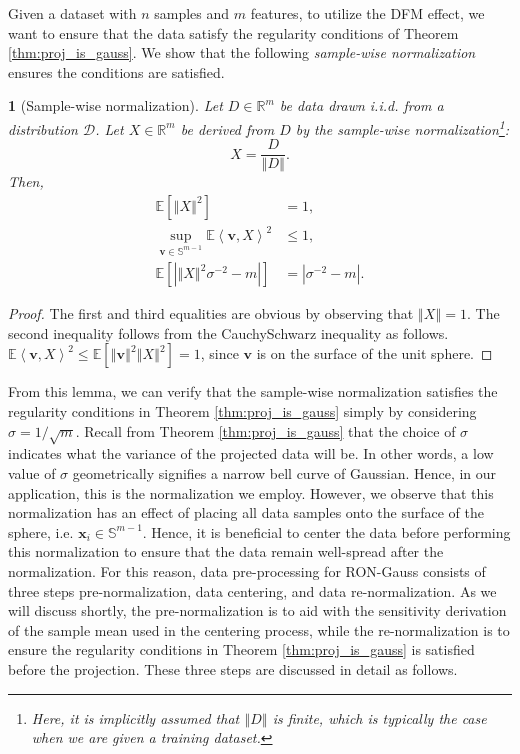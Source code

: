 \documentclass[USenglish,oneside,twocolumn]{article}
\theoremstyle{definition}
\theoremstyle{remark}
\theoremstyle{plain}
\theoremstyle{plain}
\newtheorem{lem}{\protect\lemmaname}
\providecommand{\lemmaname}{Lemma}
\begin{document}
Given a dataset with $n$ samples
and $m$ features, to utilize the DFM effect, we want to ensure that
the data satisfy the regularity conditions of Theorem \ref{thm:proj_is_gauss}.
We show that the following \emph{sample-wise normalization} ensures
the conditions are satisfied.
\begin{lem}[Sample-wise normalization]
\label{lem:normalization}Let $D\in\mathbb{R}^{m}$ be data drawn
i.i.d. from a distribution $\mathcal{D}$. Let $X\in\mathbb{R}^{m}$
be derived from $D$ by the sample-wise normalization\footnote{Here, it is implicitly assumed that $\left\Vert D\right\Vert$ is finite, which is typically the case when we are given a training dataset.}:
\[
X=\frac{D}{\left\Vert D\right\Vert }.
\]
Then, 
\begin{align*}
\mathbb{E}\left[\left\Vert X\right\Vert ^{2}\right] & =1,\\
\sup_{\mathbf{v}\in\mathbb{S}^{m-1}}\mathbb{E}\left\langle \mathbf{v},X\right\rangle ^{2} & \leq1,\\
\mathbb{E}\left[\left|\left\Vert X\right\Vert ^{2}\sigma^{-2}-m\right|\right] & =\left|\sigma^{-2}-m\right|.
\end{align*}
\end{lem}
\begin{proof}
The first and third equalities are obvious by observing that $\left\Vert X\right\Vert =1$.
The second inequality follows from the Cauchy\textendash Schwarz
inequality \cite{RefWorks:525,RefWorks:526} as follows. $\mathbb{E}\left\langle \mathbf{v},X\right\rangle ^{2}\leq\mathbb{E}\left[\left\Vert \mathbf{v}\right\Vert ^{2}\left\Vert X\right\Vert ^{2}\right]=1$,
since $\mathbf{v}$ is on the surface of the unit sphere. 
\end{proof}
%
From this lemma, we can verify that the sample-wise normalization
satisfies the regularity conditions in Theorem \ref{thm:proj_is_gauss}
simply by considering $\sigma=1/\sqrt{m}$. Recall from Theorem \ref{thm:proj_is_gauss} that the choice of $\sigma$ indicates what the variance of the projected data will be. In other words, a low value of $\sigma$ geometrically signifies a narrow bell curve of Gaussian. Hence, in our application,
this is the normalization we employ. However, we observe that this
normalization has an effect of placing all data samples onto the surface
of the sphere, i.e. $\mathbf{x}_{i}\in\mathbb{S}^{m-1}$. Hence, it
is beneficial to center the data before performing this normalization
to ensure that the data remain well-spread after the normalization.
For this reason, data pre-processing for RON-Gauss consists of three
steps \textendash{} pre-normalization, data centering, and data re-normalization.
As we will discuss shortly, the pre-normalization is to aid with the
sensitivity derivation of the sample mean used in the centering process, while the re-normalization
is to ensure the regularity conditions in Theorem \ref{thm:proj_is_gauss}
is satisfied before the projection. These three steps are discussed in detail as follows.
\end{document}
